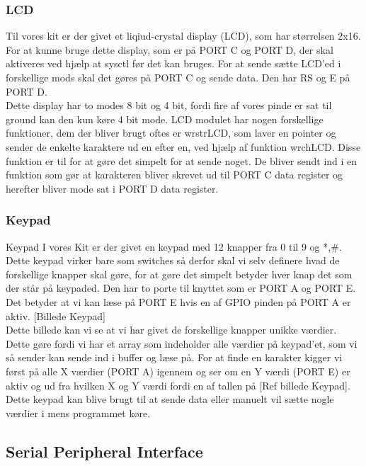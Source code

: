 \subsubsection{LCD}

Til vores kit er der givet et liqiud-crystal display (LCD), som har størrelsen 2x16. For at kunne bruge dette display, som er på PORT C og PORT D, der skal aktiveres ved hjælp at sysctl før det kan bruges. For at sende sætte LCD’ed i forskellige mods skal det gøres på PORT C og sende data. Den har RS og E på PORT D.
\\
Dette display har to modes 8 bit og 4 bit, fordi fire af vores pinde er sat til ground kan den kun køre 4 bit mode.
LCD modulet har nogen forskellige funktioner, dem der bliver brugt oftes er wr\textunderscore str\textunderscore LCD, som laver en pointer og sender de enkelte karaktere ud en efter en, ved hjælp af funktion wr\textunderscore ch\textunderscore LCD. Disse funktion er til for at gøre det simpelt for at sende noget. De bliver sendt ind i en funktion som gør at karakteren bliver skrevet ud til PORT C data register og herefter bliver mode sat i PORT D data register.

\subsubsection{Keypad}

Keypad
I vores Kit er der givet en keypad med 12 knapper fra 0 til 9 og *,\#. Dette keypad virker bare som switches så derfor skal vi selv definere hvad de forskellige knapper skal gøre, for at gøre det simpelt betyder hver knap det som der står på keypaded. Den har to porte til knyttet som er PORT A og PORT E. Det betyder at vi kan læse på PORT E hvis en af GPIO pinden på PORT A er aktiv. [Billede Keypad]
\\
Dette billede kan vi se at vi har givet de forskellige knapper unikke værdier. Dette gøre fordi vi har et array som indeholder alle værdier på keypad’et, som vi så sender kan sende ind i buffer og læse på. For at finde en karakter kigger vi først på alle X værdier (PORT A) igennem og ser om en Y værdi (PORT E) er aktiv og ud fra hvilken X og Y værdi fordi en af tallen på  [Ref billede Keypad].
\\
Dette keypad kan blive brugt til at sende data eller manuelt vil sætte nogle værdier i mens programmet køre.




\subsection{Serial Peripheral Interface}

